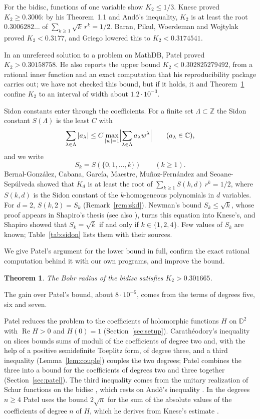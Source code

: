 \documentclass[11pt]{amsart}
\newtheorem{theorem}{Theorem}[section]
\theoremstyle{remark}
\numberwithin{equation}{section}
\newcommand{\C}{\mathbb{C}}
\newcommand{\D}{\mathbb{D}}
\newcommand{\Kbound}{0.301665}
\newcommand{\KneseVal}{0.3006}
\newcommand{\KneseRoot}{0.3006282\ldots}
\newcommand{\PatelUB}{0.302825279492}
\newcommand{\PatelLB}{0.30158758}
\newcommand{\BPWWUB}{0.3177}
\newcommand{\GriegoUB}{0.3174541}
\begin{document}
For the bidisc, functions of one variable show $K_2\le1/3$. Knese \cite[Corollary~1.2]{Kne25} proved $K_2\ge\KneseVal$: by his Theorem~1.1 and And\^o's inequality, $K_2$ is at least the root $\KneseRoot$ of $\sum_{k\ge1}\sqrt k\,r^k=1/2$. Baran, Pikul, Woerdeman and Wojtylak \cite[Theorem~6.4]{BPWW26} proved $K_2<\BPWWUB$, and Griego \cite{Gri26} lowered this to $K_2<\GriegoUB$.

In an unrefereed solution to a problem on MathDB, Patel \cite{PatMDB} proved $K_2>\PatelLB$. He also reports the upper bound $K_2<\PatelUB$, from a rational inner function and an exact computation that his reproducibility package \cite{PatZen} carries out; we have not checked this bound, but if it holds, it and Theorem~\ref{thm:main} confine $K_2$ to an interval of width about $1.2\cdot10^{-3}$.

Sidon constants enter through the coefficients. For a finite set $\Lambda\subset\mathbb Z$ the Sidon constant $S(\Lambda)$ is the least $C$ with
\[
\sum_{\lambda\in\Lambda}|a_\lambda|\le C\max_{|w|=1}\Bigl|\sum_{\lambda\in\Lambda}a_\lambda w^\lambda\Bigr|\qquad(a_\lambda\in\C),
\]
and we write
\[
S_k=S(\{0,1,\dots,k\})\qquad(k\ge1).
\]
Bernal-Gonz\'alez, Cabana, Garc\'ia, Maestre, Mu\~noz-Fern\'andez and Seoane-Sep\'ulveda \cite[Theorem~3.3]{BCGMMS21} showed that $K_d$ is at least the root of $\sum_{k\ge1}S(k,d)\,r^k=1/2$, where $S(k,d)$ is the Sidon constant of the $k$-homogeneous polynomials in $d$ variables. For $d=2$, $S(k,2)=S_k$ (Remark~\ref{rem:skd}). Newman's bound $S_k\le\sqrt k$, whose proof appears in Shapiro's thesis \cite[Chapter~3]{Sha51} (see also \cite[(1)]{Neu26}), turns this equation into Knese's, and Shapiro \cite{Sha51} showed that $S_k=\sqrt k$ if and only if $k\in\{1,2,4\}$. Few values of $S_k$ are known; Table~\ref{tab:sidon} lists them with their sources.

We give Patel's argument for the lower bound in full, confirm the exact rational computation behind it with our own programs, and improve the bound.

\begin{theorem}\label{thm:main}
The Bohr radius of the bidisc satisfies $K_2>\Kbound$.
\end{theorem}

The gain over Patel's bound, about $8\cdot10^{-5}$, comes from the terms of degrees five, six and seven.

Patel reduces the problem to the coefficients of holomorphic functions $H$ on $\D^2$ with $\operatorname{Re}H>0$ and $H(0)=1$ (Section~\ref{sec:setup}). Carath\'eodory's inequality on slices bounds sums of moduli of the coefficients of degree two and, with the help of a positive semidefinite Toeplitz form, of degree three, and a third inequality (Lemma~\ref{lem:couple}) couples the two degrees; Patel combines the three into a bound for the coefficients of degrees two and three together (Section~\ref{sec:patel}). The third inequality comes from the unitary realization of Schur functions on the bidisc \cite{Agl90,BT98}, which rests on And\^o's inequality \cite{And63}. In the degrees $n\ge4$ Patel uses the bound $2\sqrt n$ for the sum of the absolute values of the coefficients of degree $n$ of $H$, which he derives from Knese's estimate \cite[Lemma~2.1]{Kne25}.
\end{document}
